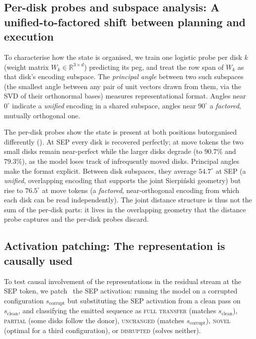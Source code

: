 \documentclass{article} %
\begin{document}
\subsection{Per-disk probes and subspace analysis: A unified-to-factored shift between planning and execution}

To characterise how the state is organised, we train one logistic probe per disk $k$ (weight matrix $W_k\in\mathbb{R}^{3\times d}$) predicting its peg, and treat the row span of $W_k$ as that disk's encoding subspace. The \emph{principal angle} between two such subspaces (the smallest angle between any pair of unit vectors drawn from them, via the SVD of their orthonormal bases) measures representational format. Angles near $0^\circ$ indicate a \emph{unified} encoding in a shared subspace, angles near $90^\circ$ a \emph{factored}, mutually orthogonal one.

The per-disk probes show the state is present at both positions butorganised differently (). At SEP every disk is recovered perfectly; at move tokens the two small disks remain near-perfect while the larger disks degrade (to $90.7\%$ and $79.3\%$), as the model loses track of infrequently moved disks. Principal angles make the format explicit. Between disk subspaces, they average $54.7^\circ$ at SEP (a \emph{unified}, overlapping encoding that supports the joint Sierpi\'nski geometry) but rise to $76.5^\circ$ at move tokens (a \emph{factored}, near-orthogonal encoding from which each disk can be read independently). The joint distance structure is thus not the sum of the per-disk parts: it lives in the overlapping geometry that the distance probe captures and the per-disk probes discard.

\subsection{Activation patching: The representation is causally used}

To test causal involvement of the representations in the residual stream at the SEP token, we patch~\citep{meng2022locating} the SEP activation: running the model on a corrupted configuration $s_\text{corrupt}$ but substituting the SEP activation from a clean pass on $s_\text{clean}$, and classifying the emitted sequence as \textsc{full transfer} (matches $s_\text{clean}$), \textsc{partial} (some disks follow the donor), \textsc{unchanged} (matches $s_\text{corrupt}$), \textsc{novel} (optimal for a third configuration), or \textsc{disrupted} (solves neither).
\end{document}
